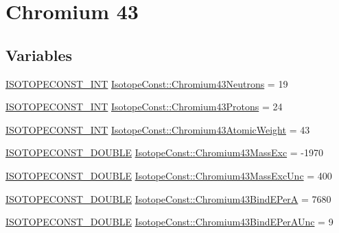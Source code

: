 \hypertarget{group___isotope_const-_chromium-_cr43}{}\section{Chromium 43}
\label{group___isotope_const-_chromium-_cr43}
\subsection*{Variables}
\begin{DoxyCompactItemize}
\item 
\mbox{\hyperlink{group___isotope_const-_macros_ga5f18360b3e99483a35c32d789e62621c}{I\+S\+O\+T\+O\+P\+E\+C\+O\+N\+S\+T\+\_\+\+I\+NT}} \mbox{\hyperlink{group___isotope_const-_chromium-_cr43_ga7756f253a36b23c5e03d108841156df5}{Isotope\+Const\+::\+Chromium43\+Neutrons}} = 19
\item 
\mbox{\hyperlink{group___isotope_const-_macros_ga5f18360b3e99483a35c32d789e62621c}{I\+S\+O\+T\+O\+P\+E\+C\+O\+N\+S\+T\+\_\+\+I\+NT}} \mbox{\hyperlink{group___isotope_const-_chromium-_cr43_ga7991942c32452deb1123d2be33314166}{Isotope\+Const\+::\+Chromium43\+Protons}} = 24
\item 
\mbox{\hyperlink{group___isotope_const-_macros_ga5f18360b3e99483a35c32d789e62621c}{I\+S\+O\+T\+O\+P\+E\+C\+O\+N\+S\+T\+\_\+\+I\+NT}} \mbox{\hyperlink{group___isotope_const-_chromium-_cr43_gad9f5f13c5b1d954212b8ce09bfddb9b6}{Isotope\+Const\+::\+Chromium43\+Atomic\+Weight}} = 43
\item 
\mbox{\hyperlink{group___isotope_const-_macros_ga8f45a7272ce02c0b4c65c44636ed719a}{I\+S\+O\+T\+O\+P\+E\+C\+O\+N\+S\+T\+\_\+\+D\+O\+U\+B\+LE}} \mbox{\hyperlink{group___isotope_const-_chromium-_cr43_ga56d7d183e7acb0dca74873fc41f1053d}{Isotope\+Const\+::\+Chromium43\+Mass\+Exc}} = -\/1970
\item 
\mbox{\hyperlink{group___isotope_const-_macros_ga8f45a7272ce02c0b4c65c44636ed719a}{I\+S\+O\+T\+O\+P\+E\+C\+O\+N\+S\+T\+\_\+\+D\+O\+U\+B\+LE}} \mbox{\hyperlink{group___isotope_const-_chromium-_cr43_ga2df01909efe88771808cf50fa68c3ea6}{Isotope\+Const\+::\+Chromium43\+Mass\+Exc\+Unc}} = 400
\item 
\mbox{\hyperlink{group___isotope_const-_macros_ga8f45a7272ce02c0b4c65c44636ed719a}{I\+S\+O\+T\+O\+P\+E\+C\+O\+N\+S\+T\+\_\+\+D\+O\+U\+B\+LE}} \mbox{\hyperlink{group___isotope_const-_chromium-_cr43_ga4038cdfd511350fad1f948b25c86d64f}{Isotope\+Const\+::\+Chromium43\+Bind\+E\+PerA}} = 7680
\item 
\mbox{\hyperlink{group___isotope_const-_macros_ga8f45a7272ce02c0b4c65c44636ed719a}{I\+S\+O\+T\+O\+P\+E\+C\+O\+N\+S\+T\+\_\+\+D\+O\+U\+B\+LE}} \mbox{\hyperlink{group___isotope_const-_chromium-_cr43_ga7bb93697397d10cb4ff82f7eb24b701d}{Isotope\+Const\+::\+Chromium43\+Bind\+E\+Per\+A\+Unc}} = 9

\end{DoxyCompactItemize}
